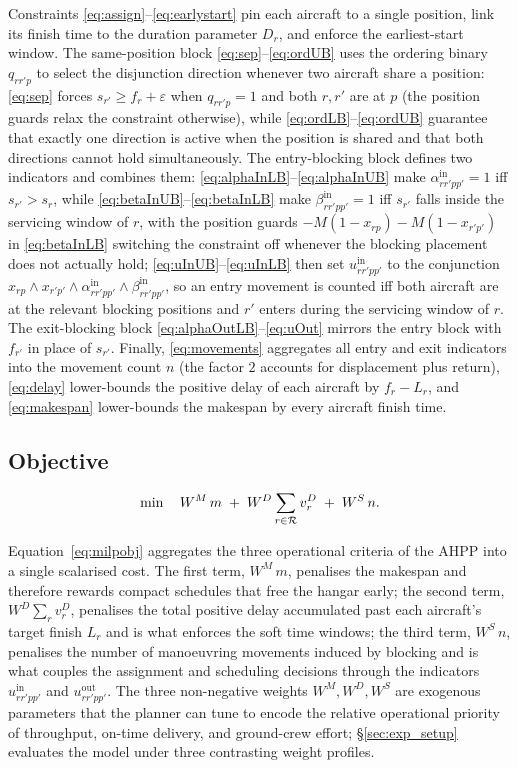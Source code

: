 Constraints \eqref{eq:assign}--\eqref{eq:earlystart} pin each aircraft to
a single position, link its finish time to the duration parameter $D_r$,
and enforce the earliest-start window.  The same-position block
\eqref{eq:sep}--\eqref{eq:ordUB} uses the ordering binary $q_{rr'p}$ to
select the disjunction direction whenever two aircraft share a position:
\eqref{eq:sep} forces $s_{r'} \ge f_r + \varepsilon$ when $q_{rr'p} = 1$
and both $r, r'$ are at $p$ (the position guards relax the constraint
otherwise), while \eqref{eq:ordLB}--\eqref{eq:ordUB} guarantee that
exactly one direction is active when the position is shared and that
both directions cannot hold simultaneously.  The entry-blocking block
defines two indicators and combines them:
\eqref{eq:alphaInLB}--\eqref{eq:alphaInUB} make
$\alpha^{\mathrm{in}}_{rr'pp'} = 1$ iff $s_{r'} > s_r$, while
\eqref{eq:betaInUB}--\eqref{eq:betaInLB} make
$\beta^{\mathrm{in}}_{rr'pp'} = 1$ iff $s_{r'}$ falls inside the
servicing window of $r$, with the position guards
$-M(1 - x_{rp}) - M(1 - x_{r'p'})$ in \eqref{eq:betaInLB} switching the
constraint off whenever the blocking placement does not actually hold;
\eqref{eq:uInUB}--\eqref{eq:uInLB} then set $u^{\mathrm{in}}_{rr'pp'}$ to
the conjunction $x_{rp} \wedge x_{r'p'} \wedge
\alpha^{\mathrm{in}}_{rr'pp'} \wedge \beta^{\mathrm{in}}_{rr'pp'}$, so an
entry movement is counted iff both aircraft are at the relevant blocking
positions and $r'$ enters during the servicing window of $r$.  The
exit-blocking block \eqref{eq:alphaOutLB}--\eqref{eq:uOut} mirrors the
entry block with $f_{r'}$ in place of $s_{r'}$.  Finally,
\eqref{eq:movements} aggregates all entry and exit indicators into the
movement count $n$ (the factor $2$ accounts for displacement plus
return), \eqref{eq:delay} lower-bounds the positive delay of each
aircraft by $f_r - L_r$, and \eqref{eq:makespan} lower-bounds the
makespan by every aircraft finish time.

\subsection*{Objective}
\begin{equation}
  \min \quad W^M\, m
         \;+\; W^D \sum_{r \in \mathcal{R}} v^D_r
         \;+\; W^S\, n.
  \label{eq:milpobj}
\end{equation}

Equation~\eqref{eq:milpobj} aggregates the three operational criteria of
the AHPP into a single scalarised cost.  The first term, $W^M\,m$,
penalises the makespan and therefore rewards compact schedules that free
the hangar early; the second term, $W^D \sum_r v^D_r$, penalises the
total positive delay accumulated past each aircraft's target finish
$L_r$ and is what enforces the soft time windows; the third term,
$W^S\,n$, penalises the number of manoeuvring movements induced by
blocking and is what couples the assignment and scheduling decisions
through the indicators $u^{\mathrm{in}}_{rr'pp'}$ and
$u^{\mathrm{out}}_{rr'pp'}$.  The three non-negative weights
$W^M, W^D, W^S$ are exogenous parameters that the planner can tune to
encode the relative operational priority of throughput, on-time
delivery, and ground-crew effort; \S\ref{sec:exp_setup} evaluates the
model under three contrasting weight profiles.

